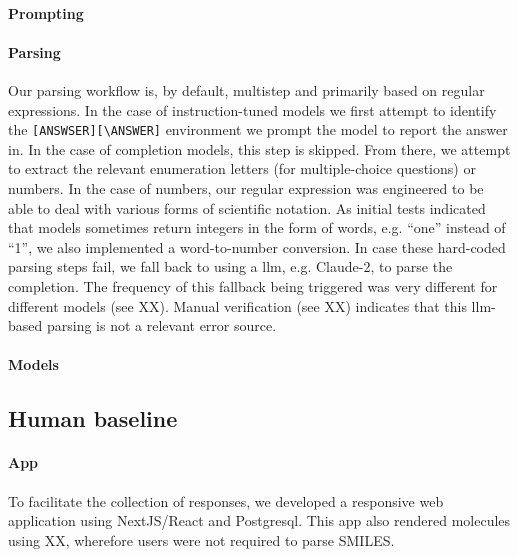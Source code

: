 \documentclass[11pt, oneside]{aastex631}
\begin{document}
\paragraph{Prompting}

\paragraph{Parsing}
Our parsing workflow is, by default, multistep and primarily based on regular expressions. In the case of instruction-tuned models we first attempt to identify the \texttt{[ANSWSER][\textbackslash ANSWER]} environment we prompt the model to report the answer in. In the case of completion models, this step is skipped. From there, we attempt to extract the relevant enumeration letters (for multiple-choice questions) or numbers. In the case of numbers, our regular expression was engineered to be able to deal with various forms of scientific notation. As initial tests indicated that models sometimes return integers in the form of words, e.g. \enquote{one} instead of \enquote{1}, we also implemented a word-to-number conversion. In case these hard-coded parsing steps fail, we fall back to using a \gls{llm}, e.g. Claude-2, to parse the completion. The frequency of this fallback being triggered was very different for different models (see XX). Manual verification (see XX) indicates that this \gls{llm}-based parsing is not a relevant error source.

\paragraph{Models}


\subsection{Human baseline}

\paragraph{App} To facilitate the collection of responses, we developed a responsive web application using NextJS/React and Postgresql. This app also rendered molecules using XX, wherefore users were not required to parse SMILES.
\end{document}
